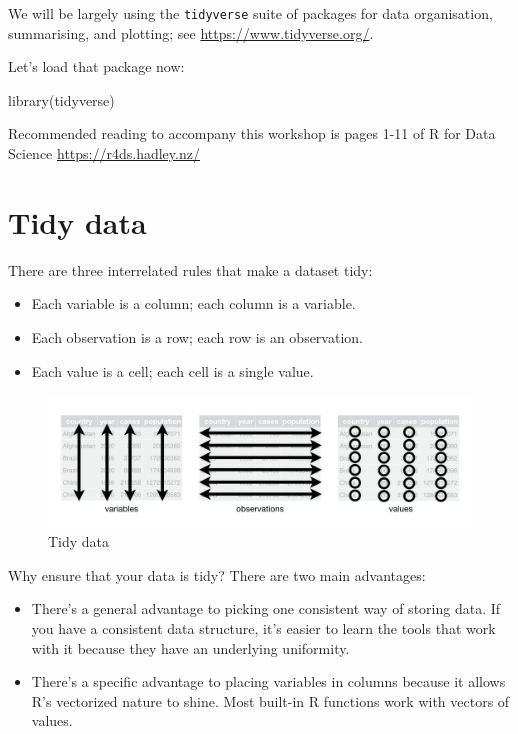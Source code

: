 \documentclass[
  letterpaper,
  DIV=11,
  numbers=noendperiod]{scrreprt}
\newenvironment{Shaded}{\begin{snugshade}}{\end{snugshade}}
\newcommand{\FunctionTok}[1]{\textcolor[rgb]{0.28,0.35,0.67}{#1}}
\newcommand{\NormalTok}[1]{\textcolor[rgb]{0.00,0.23,0.31}{#1}}
\providecommand{\tightlist}{%
  \setlength{\itemsep}{0pt}\setlength{\parskip}{0pt}}\usepackage{longtable,booktabs,array}
\begin{document}
We will be largely using the \texttt{tidyverse} suite of packages for
data organisation, summarising, and plotting; see
\url{https://www.tidyverse.org/}.

Let's load that package now:

\begin{Shaded}
\begin{Highlighting}[]
\FunctionTok{library}\NormalTok{(tidyverse)}
\end{Highlighting}
\end{Shaded}

Recommended reading to accompany this workshop is pages 1-11 of R for
Data Science \url{https://r4ds.hadley.nz/}

\hypertarget{tidy-data}{%
\chapter{Tidy data}\label{tidy-data}}

There are three interrelated rules that make a dataset tidy:

\begin{itemize}
\tightlist
\item
  Each variable is a column; each column is a variable.
\item
  Each observation is a row; each row is an observation.
\item
  Each value is a cell; each cell is a single value.
\end{itemize}

\begin{figure}

{\centering \includegraphics{images/tidy_data.png}

}

\caption{\label{fig-tidy}Tidy data}

\end{figure}

Why ensure that your data is tidy? There are two main advantages:

\begin{itemize}
\item
  There's a general advantage to picking one consistent way of storing
  data. If you have a consistent data structure, it's easier to learn
  the tools that work with it because they have an underlying
  uniformity.
\item
  There's a specific advantage to placing variables in columns because
  it allows R's vectorized nature to shine. Most built-in R functions
  work with vectors of values.
\end{itemize}
\end{document}
